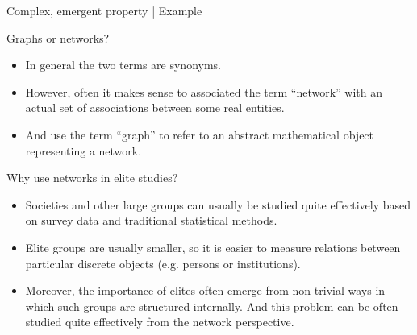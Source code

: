 \documentclass[
    hyperref={colorlinks,linkcolor=blue,urlcolor=blue,citecolor=blue}
]{beamer}
\begin{document}
\begin{frame}{Complex, emergent property | Example}
    \begin{center}
    \end{center}
\end{frame}

\begin{frame}{Graphs or networks?}
\begin{itemize}
    \item<2-> In general the two terms are synonyms.
    \item<3-> However, often it makes sense to associated the term
    \enquote{network} with an actual set of associations between some
    real entities.
    \item<4-> And use the term \enquote{graph} to refer to an abstract
    mathematical object representing a network.
\end{itemize}
\end{frame}

\begin{frame}{Why use networks in elite studies?}
\begin{itemize}
    \item<2-> Societies and other large groups can usually be studied quite
    effectively based on survey data and traditional statistical methods.
    \item<3-> Elite groups are usually smaller, so it is easier to measure
    relations between particular discrete objects (e.g. persons or institutions).
    \item<4-> Moreover, the importance of elites often emerge from non-trivial
    ways in which such groups are structured internally. And this problem
    can be often studied quite effectively from the network perspective.
\end{itemize}
\end{frame}
\end{document}
